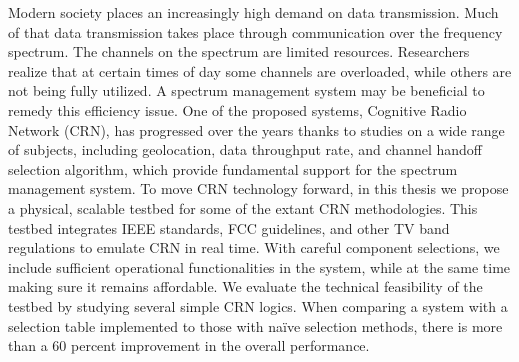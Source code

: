 Modern society places an increasingly high demand on data transmission. Much of that data transmission takes place through communication over the frequency spectrum. The channels on the spectrum are limited resources. Researchers realize that at certain times of day some channels are overloaded, while others are not being fully utilized. A spectrum management system may be beneficial to remedy this efficiency issue. One of the proposed systems, Cognitive Radio Network (CRN), has progressed over the years thanks to studies on a wide range of subjects, including geolocation, data throughput rate, and channel handoff selection algorithm, which provide fundamental support for the spectrum management system. To move CRN technology forward, in this thesis we propose a physical, scalable testbed for some of the extant CRN methodologies. This testbed integrates IEEE standards, FCC guidelines, and other TV band regulations to emulate CRN in real time. With careful component selections, we include sufficient operational functionalities in the system, while at the same time making sure it remains affordable. We evaluate the technical feasibility of the testbed by studying several simple CRN logics. When comparing a system with a selection table implemented to those with na\"ive selection methods, there is more than a 60 percent improvement in the overall performance.

